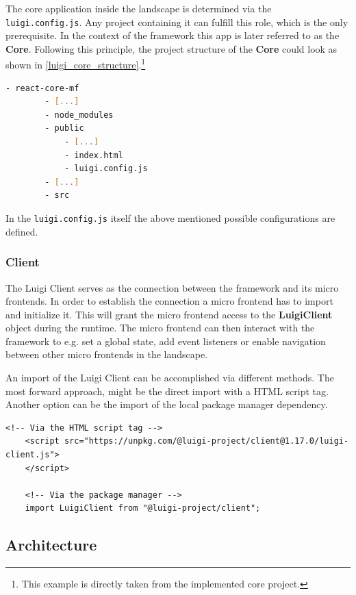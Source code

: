The core application inside the landscape is determined via the \texttt{luigi.config.js}. Any project containing it can fulfill this role, which is the only prerequisite. In the context of the framework this app is later referred to as the \textbf{Core}.
Following this principle, the project structure of the \textbf{Core} could look as shown in \ref{luigi_core_structure}.\footnote{This example is directly taken from the implemented core project.}  

\begin{lstlisting}[language=Bash, caption=Project structure for a Luigi Core application including the \texttt{luigi.config.js}, label=luigi_core_structure]
	- react-core-mf
		- [...]
		- node_modules
		- public
			- [...]
			- index.html
			- luigi.config.js
		- [...]
		- src
\end{lstlisting}

In the \texttt{luigi.config.js} itself the above mentioned possible configurations are defined.\cite{luigi_doc_core}

\subsubsection{Client}

The Luigi Client serves as the connection between the framework and its micro frontends. In order to establish the connection a micro frontend has to import and initialize it. This will grant the micro frontend access to the \textbf{LuigiClient} object during the runtime. The micro frontend can then interact with the framework to e.g. set a global state, add event listeners or enable navigation between other micro frontends in the landscape.

An import of the Luigi Client can be accomplished via different methods. The most forward approach, might be the direct import with a HTML script tag. Another option can be the import of the local package manager dependency.\cite{luigi_client}

\begin{lstlisting}[caption=Import methods of the Luigi Client]
	<!-- Via the HTML script tag -->
	<script src="https://unpkg.com/@luigi-project/client@1.17.0/luigi-client.js">
	</script>
	
	<!-- Via the package manager -->
	import LuigiClient from "@luigi-project/client";
\end{lstlisting}

\subsection{Architecture}

